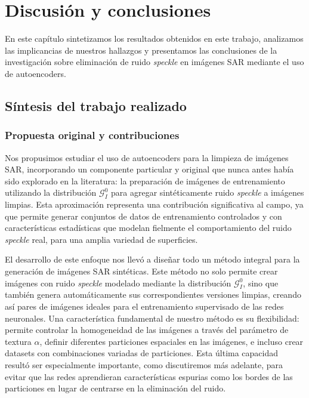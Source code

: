 \chapter{Discusión y conclusiones}
\label{discusion}

En este capítulo sintetizamos los resultados obtenidos en este trabajo, analizamos las implicancias de nuestros hallazgos y presentamos las conclusiones de la investigación sobre eliminación de ruido \emph{speckle} en imágenes SAR mediante el uso de autoencoders.

\section{Síntesis del trabajo realizado}

\subsection{Propuesta original y contribuciones}

Nos propusimos estudiar el uso de autoencoders para la limpieza de imágenes SAR, incorporando un componente particular y original que nunca antes había sido explorado en la literatura: la preparación de imágenes de entrenamiento utilizando la distribución $\mathcal{G}_I^0$ para agregar sintéticamente ruido \emph{speckle} a imágenes limpias. Esta aproximación representa una contribución significativa al campo, ya que permite generar conjuntos de datos de entrenamiento controlados y con características estadísticas que modelan fielmente el comportamiento del ruido \emph{speckle} real, para una amplia variedad de superficies.

El desarrollo de este enfoque nos llevó a diseñar todo un método integral para la generación de imágenes SAR sintéticas. Este método no solo permite crear imágenes con ruido \emph{speckle} modelado mediante la distribución $\mathcal{G}_I^0$, sino que también genera automáticamente sus correspondientes versiones limpias, creando así pares de imágenes ideales para el entrenamiento supervisado de las redes neuronales. Una característica fundamental de nuestro método es su flexibilidad: permite controlar la homogeneidad de las imágenes a través del parámetro de textura $\alpha$, definir diferentes particiones espaciales en las imágenes, e incluso crear datasets con combinaciones variadas de particiones. Esta última capacidad resultó ser especialmente importante, como discutiremos más adelante, para evitar que las redes aprendieran características espurias como los bordes de las particiones en lugar de centrarse en la eliminación del ruido.

